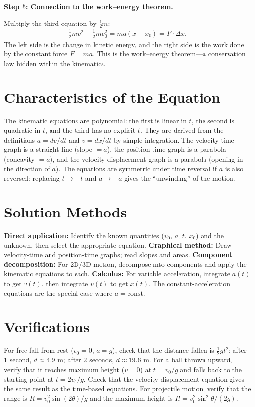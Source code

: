 \textbf{Step 5: Connection to the work--energy theorem.}

Multiply the third equation by $\frac{1}{2}m$:
\begin{align}
\tfrac{1}{2}mv^2 - \tfrac{1}{2}mv_0^2 = ma(x - x_0) = F\cdot\Delta x.
\end{align}
The left side is the change in kinetic energy, and the right side is the work done by the constant force $F = ma$. This is the work--energy theorem---a conservation law hidden within the kinematics.

\section*{Characteristics of the Equation}

The kinematic equations are polynomial: the first is linear in $t$, the second is quadratic in $t$, and the third has no explicit $t$. They are derived from the definitions $a = dv/dt$ and $v = dx/dt$ by simple integration. The velocity-time graph is a straight line (slope $= a$), the position-time graph is a parabola (concavity $= a$), and the velocity-displacement graph is a parabola (opening in the direction of $a$). The equations are symmetric under time reversal if $a$ is also reversed: replacing $t \to -t$ and $a \to -a$ gives the ``unwinding'' of the motion.
\section*{Solution Methods}

\textbf{Direct application:} Identify the known quantities ($v_0$, $a$, $t$, $x_0$) and the unknown, then select the appropriate equation. \textbf{Graphical method:} Draw velocity-time and position-time graphs; read slopes and areas. \textbf{Component decomposition:} For 2D/3D motion, decompose into components and apply the kinematic equations to each. \textbf{Calculus:} For variable acceleration, integrate $a(t)$ to get $v(t)$, then integrate $v(t)$ to get $x(t)$. The constant-acceleration equations are the special case where $a = \text{const}$.
\section*{Verifications}

For free fall from rest ($v_0 = 0$, $a = g$), check that the distance fallen is $\frac{1}{2}gt^2$: after 1 second, $d \approx 4.9$ m; after 2 seconds, $d \approx 19.6$ m. For a ball thrown upward, verify that it reaches maximum height ($v = 0$) at $t = v_0/g$ and falls back to the starting point at $t = 2v_0/g$. Check that the velocity-displacement equation gives the same result as the time-based equations. For projectile motion, verify that the range is $R = v_0^2\sin(2\theta)/g$ and the maximum height is $H = v_0^2\sin^2\theta/(2g)$.
